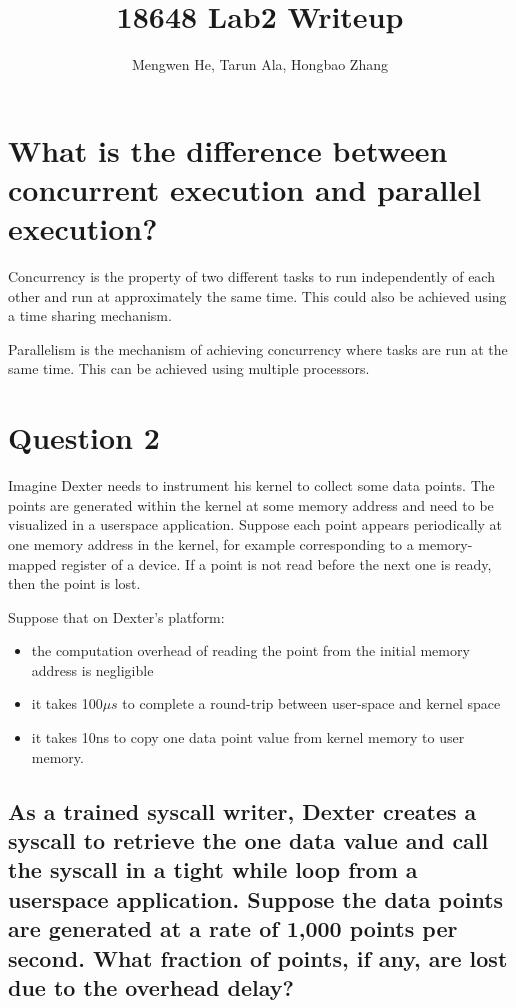 \documentclass[letterpaper,10pt]{article}
\title{\textbf{18648 Lab2 Writeup}}
\author{Mengwen He, Tarun Ala, Hongbao Zhang}
\begin{document}
\maketitle

\section{What is the difference between concurrent execution and parallel execution?}
Concurrency is the property of two different tasks to run independently of each other and run at
approximately the same time. This could also be achieved using a time sharing mechanism.

Parallelism is the mechanism of achieving concurrency where tasks are run at the same time. This can
be achieved using multiple processors.

\section{Question 2}

Imagine Dexter needs to instrument his kernel to collect some data points. The points are generated
within the kernel at some memory address and need to be visualized in a userspace application. Suppose
each point appears periodically at one memory address in the kernel, for example corresponding to a
memory-mapped register of a device. If a point is not read before the next one is ready, then the point
is lost.

Suppose that on Dexter’s platform:
\begin{itemize}
\item  the computation overhead of reading the point from the initial memory address is negligible
\item  it takes 100$\mu s$ to complete a round-trip between user-space and kernel space
\item  it takes 10ns to copy one data point value from kernel memory to user memory.
\end{itemize}

\subsection{As a trained syscall writer, Dexter creates a syscall to retrieve the one data value and
call the syscall in a tight while loop from a userspace application. Suppose the data points are
generated at a rate of 1,000 points per second. What fraction of points, if any, are lost due to the
overhead delay?
}
\end{document}

